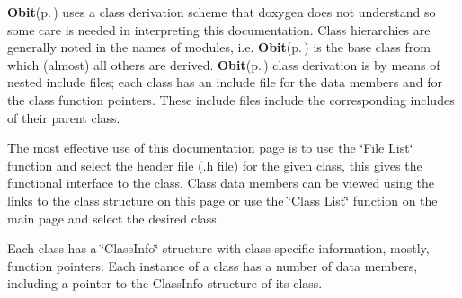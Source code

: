 {\bf Obit}{\rm (p.\,\pageref{structObit})} uses a class derivation scheme that doxygen does not understand so some care is needed in interpreting this documentation. Class hierarchies are generally noted in the names of modules, i.e. {\bf Obit}{\rm (p.\,\pageref{structObit})} is the base class from which (almost) all others are derived. {\bf Obit}{\rm (p.\,\pageref{structObit})} class derivation is by means of nested include files; each class has an include file for the data members and for the class function pointers. These include files include the corresponding includes of their parent class.

The most effective use of this documentation page is to use the \char`\"{}File List\char`\"{} function and select the header file (.h file) for the given class, this gives the functional interface to the class. Class data members can be viewed using the links to the class structure on this page or use the \char`\"{}Class List\char`\"{} function on the main page and select the desired class.

Each class has a \char`\"{}Class\-Info\char`\"{} structure with class specific information, mostly, function pointers. Each instance of a class has a number of data members, including a pointer to the Class\-Info structure of its class. 